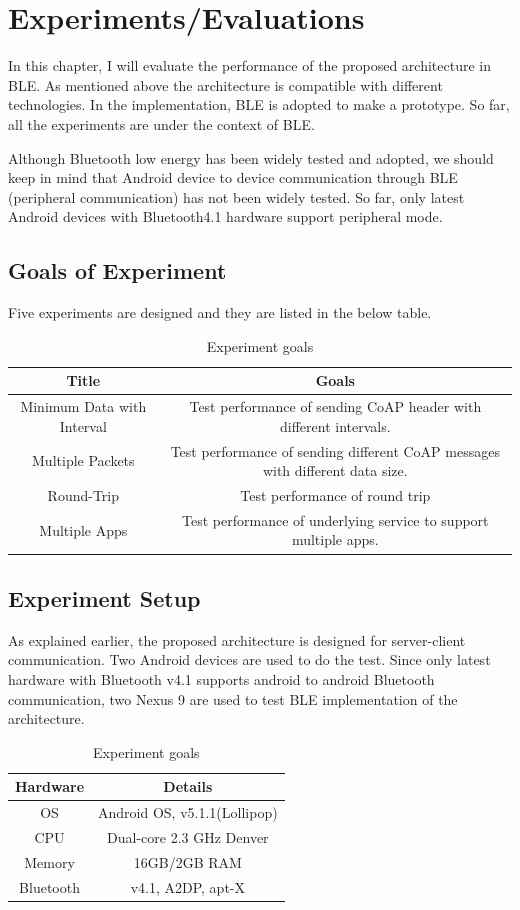 \documentclass{Nan_Thesis}
\begin{document}
\chapter{Experiments/Evaluations} 
In this chapter, I will evaluate the performance of the proposed architecture in BLE. As mentioned above the architecture is compatible with different technologies. In the implementation, BLE is adopted to make a prototype. So far, all the experiments are under the context of BLE.

Although Bluetooth low energy has been widely tested and adopted, we should keep in mind that Android device to device communication through BLE (peripheral communication) has not been widely tested. So far, only latest Android devices with Bluetooth4.1 hardware support peripheral mode. 
\section{Goals of Experiment}
Five experiments are designed and they are listed in the below table.

\begin{table}[h!]
  \centering
  \caption{Experiment goals}
  \label{tab:table1}
  \begin{tabular}{cc}
    \toprule
    Title & Goals \\
    \midrule
    Minimum Data with Interval & Test performance of sending CoAP header with different intervals. \\
    Multiple Packets & Test performance of sending different CoAP messages with different data size. \\
    Round-Trip & Test performance of round trip \\
    Multiple Apps & Test performance of underlying service to support multiple apps. \\
    \bottomrule
  \end{tabular}
\end{table}
  
\section{Experiment Setup}
As explained earlier, the proposed architecture is designed for server-client communication. Two Android devices are used to do the test. Since only latest hardware with Bluetooth v4.1 supports android to android Bluetooth communication, two Nexus 9 are used to test BLE implementation of the architecture.
\newpage

\begin{table}[h!]
  \centering
  \caption{Experiment goals}
  \label{tab:table1}
  \begin{tabular}{cc}
    \toprule
    Hardware & Details \\
    \midrule
    OS & Android OS, v5.1.1(Lollipop)\\
    CPU & Dual-core 2.3 GHz Denver \\
    Memory & 16GB/2GB RAM \\
    Bluetooth & v4.1, A2DP, apt-X \\
    \bottomrule
  \end{tabular}
\end{table}
\end{document}
